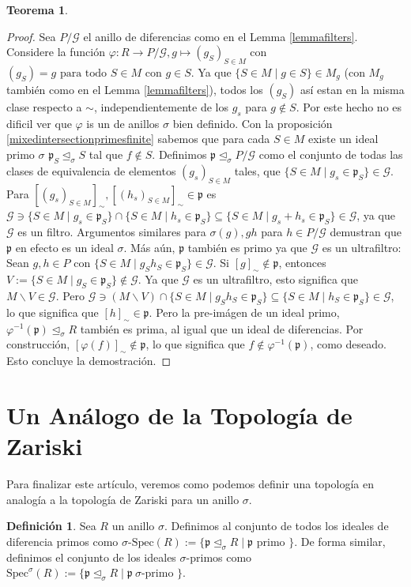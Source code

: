 \documentclass[12pt,a4paper,BCOR15mm,twoside,DIV12]{article}
\def\Spec{\text{Spec}}
\def\fa{\text{ para todo }}
\def\p{\mathfrak{p}}
\def\s{\sigma}
\def\si{\unlhd_{\sigma}}
\newenvironment{bew}{\begin{proof}[Proof]}{\end{proof}}
\theoremstyle{definition}
\newtheorem{theorem}[Satz]{Teorema}
\newtheorem{defn}[Satz]{Definición}
\begin{document}
\begin{theorem}
\begin{bew}
Sea $P/\mathcal{G}$ el anillo de diferencias como en el Lemma \ref{lemmafilters}. Considere la función $\varphi: R \rightarrow P/\mathcal{G}, g \mapsto (g_S)_{S \in M}$ con $(g_S) = g \fa S \in M$ con $g \in S$. 
Ya que $\{ S \in M \mid g \in S \} \in M_g$ (con $M_g$ también como en el Lemma \ref{lemmafilters}), todos los $(g_S)$ así estan en la misma clase respecto a $\sim$, independientemente de los $g_s$ para $g \notin S$. 
Por este hecho no es dificil ver que $\varphi$ is un de anillos $\s$ bien definido. 
Con la proposición \ref{mixedintersectionprimesfinite} sabemos que para cada $S \in M$ existe un ideal primo $\s$ $\p_S \si S$ tal que $f \notin S$. 
Definimos $\p \si P/\mathcal{G}$ como el conjunto de todas las clases de equivalencia de elementos $(g_s)_{S \in M}$ tales, que $\{ S \in M \mid g_s \in \p_S \} \in \mathcal{G}$. 
Para $[(g_s)_{S \in M}]_{\sim}, [(h_s)_{S \in M}]_{\sim} \in \p$ es $ \mathcal{G} \ni \{ S \in M \mid  g_s \in \p_S \} \cap  \{ S \in M \mid  h_s \in \p_S \} \subseteq \{ S \in M \mid  g_s + h_s \in \p_S \} \in \mathcal{G}$,
ya que $\mathcal{G}$ es un filtro. Argumentos similares para $\s(g), gh$ para $h \in P/\mathcal{G}$ demustran que $\p$ en efecto es un ideal $\s$. Más aún, $\p$ también es primo  ya que  $\mathcal{G}$ es un ultrafiltro:
Sean $g,h \in P$ con $\{ S \in M \mid g_Sh_S \in \p_S \} \in \mathcal{G}$. Si $[g]_\sim \notin \p$, entonces $V:= \{ S \in M \mid g_S \in \p_S \} \notin \mathcal{G}$. Ya que $\mathcal{G}$ es un ultrafiltro, 
esto significa que $M \backslash V \in \mathcal{G}$. Pero $\mathcal{G} \ni (M \backslash V) \cap \{ S \in M \mid g_S h_S \in \p_S \} \subseteq \{ S \in M \mid h_S \in \p_S \} \in \mathcal{G}$, lo que significa que $[h]_\sim \in \p$.
Pero la pre-imágen de un ideal primo, $\varphi^{-1}(\p) \si R$ también es prima, al igual que un ideal de diferencias. Por construcción, $[\varphi(f)]_\sim \notin \p$, lo que significa que $f \notin \varphi^{-1}(\p)$, como deseado. Esto concluye la demostración.
\end{bew}
\end{theorem}

\section{Un Análogo de la Topología de Zariski}

Para finalizar este artículo, veremos como podemos definir una topología en analogía a la topología de Zariski para un anillo $\s$.

\begin{defn}
Sea $R$ un anillo $\s$. Definimos al conjunto de todos los ideales de diferencia primos como $\s$-$\Spec(R):= \{ \p \si R \mid \p \text{ primo }\}$. De forma similar, definimos el conjunto de los ideales $\s$-primos como $\Spec^\s(R):= \{ \p \si R \mid \p ~ \s\text{-primo }\}$.
\end{defn}
\end{document}
